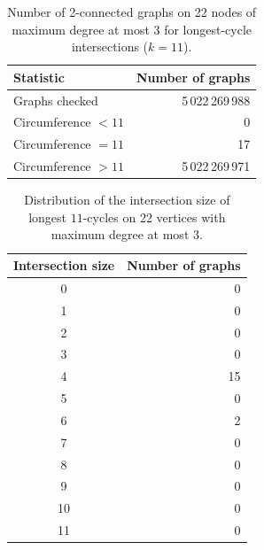 \begin{table}[ht]
\centering
\caption{Number of 2-connected graphs on 22 nodes of maximum degree at most 3 for longest-cycle intersections ($k=11$).}
\label{tab:summary-geng-2con-n22}
\begin{tabular}{lr}
\toprule
Statistic & Number of graphs \\
\midrule
Graphs checked & 5\,022\,269\,988 \\
Circumference $<11$ & 0 \\
Circumference $=11$ & 17 \\
Circumference $>11$ & 5\,022\,269\,971 \\
\bottomrule
\end{tabular}
\end{table}


\begin{table}[ht]
\centering
\caption{Distribution of the intersection size of longest $11$-cycles on 22 vertices with maximum degree at most 3.}
\label{tab:intersection-d22d3}
\begin{tabular}{cr}
\toprule
Intersection size & Number of graphs \\
\midrule
0 & 0 \\
1 & 0 \\
2 & 0 \\
3 & 0 \\
4 & 15 \\
5 & 0 \\
6 & 2 \\
7 & 0 \\
8 & 0 \\
9 & 0 \\
10 & 0 \\
11 & 0 \\
\bottomrule
\end{tabular}
\end{table}
